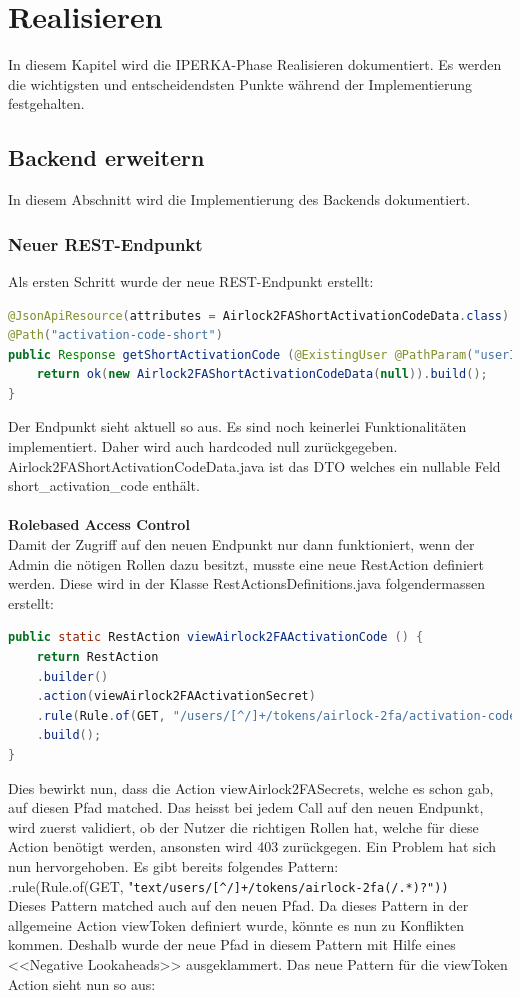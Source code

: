 \chapter{Realisieren}\label{ch:realisieren}
In diesem Kapitel wird die IPERKA-Phase Realisieren dokumentiert. Es werden die wichtigsten und entscheidendsten Punkte während der Implementierung festgehalten. 

\section{Backend erweitern}
In diesem Abschnitt wird die Implementierung des Backends dokumentiert. 
\subsection{Neuer REST-Endpunkt}
Als ersten Schritt wurde der neue REST-Endpunkt erstellt:
\begin{lstlisting}[language=Java]
	@JsonApiResource(attributes = Airlock2FAShortActivationCodeData.class)
@Path("activation-code-short")
public Response getShortActivationCode (@ExistingUser @PathParam("userId") @Parameter(schema = @Schema(type = "string")) UserParam userParam) {
	return ok(new Airlock2FAShortActivationCodeData(null)).build();
}
\end{lstlisting}
Der Endpunkt sieht aktuell so aus. Es sind noch keinerlei Funktionalitäten implementiert. Daher wird auch hardcoded null zurückgegeben. Airlock2FAShortActivationCodeData.java ist das DTO welches ein nullable Feld \flqq short\_activation\_code\frqq{} enthält. \\
\\
\textbf{Rolebased Access Control}\\
Damit der Zugriff auf den neuen Endpunkt nur dann funktioniert, wenn der Admin die nötigen Rollen dazu besitzt, musste eine neue RestAction definiert werden. Diese wird in der Klasse RestActionsDefinitions.java folgendermassen erstellt:
\begin{lstlisting}[language=Java]
	public static RestAction viewAirlock2FAActivationCode () {
	return RestAction
	.builder()
	.action(viewAirlock2FAActivationSecret)
	.rule(Rule.of(GET, "/users/[^/]+/tokens/airlock-2fa/activation-code-short"))
	.build();
}
\end{lstlisting}
Dies bewirkt nun, dass die Action \flqq viewAirlock2FASecrets\frqq{}, welche es schon gab, auf diesen Pfad matched. Das heisst bei jedem Call auf den neuen Endpunkt, wird zuerst validiert, ob der Nutzer die richtigen Rollen hat, welche für diese Action benötigt werden, ansonsten wird 403 zurückgegen.
Ein Problem hat sich nun hervorgehoben. Es gibt bereits folgendes Pattern:\\
 \flqq .rule(Rule.of(GET, "\verb*|text/users/[^/]+/tokens/airlock-2fa(/.*)?"))|\frqq{}
\\
Dieses Pattern matched auch auf den neuen Pfad. Da dieses Pattern in der allgemeine Action \flqq viewToken \frqq{} definiert wurde, könnte es nun zu Konflikten kommen. Deshalb wurde der neue Pfad in diesem Pattern mit Hilfe eines <<Negative Lookaheads>> \cite{lookahead} ausgeklammert. Das neue Pattern für die viewToken Action sieht nun so aus:\\


